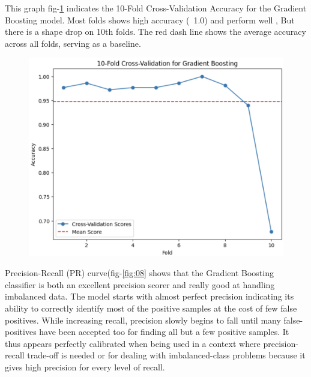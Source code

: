 \documentclass[conference]{IEEEtran} %
\begin{document}
This graph fig-\ref{fig:10fold} indicates the 10-Fold Cross-Validation Accuracy for the Gradient Boosting model. Most folds shows high accuracy (~1.0) and perform well , But there is a shape drop on 10th folds. The red dash line shows the average accuracy across all folds, serving as a baseline.
\begin{figure}[ht]
    \centering
    \includegraphics[width=\linewidth]{Fig-06.png}
    \caption{}
    \label{fig:10fold}
\end{figure}
\FloatBarrier

Precision-Recall (PR) curve(fig-\ref{fig:08} shows that the Gradient Boosting classifier is both an excellent precision scorer and really good at handling imbalanced data. The model starts with almost perfect precision indicating its ability to correctly identify most of the positive samples at the cost of few false positives. While increasing recall, precision slowly begins to fall until many false-positives have been accepted too for finding all but a few positive samples. It thus appears perfectly calibrated when being used in a context where precision-recall trade-off is needed or for dealing with imbalanced-class problems because it gives high precision for every level of recall.
\end{document}
